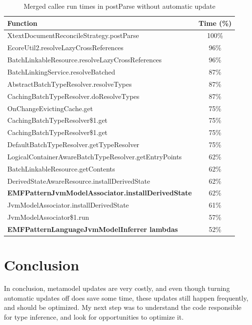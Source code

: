 \documentclass[11pt,a4paper,oneside]{report}
\begin{document}
\begin{table}[ht]
    \footnotesize
    \centering
    \begin{tabular}{ l c }
        \toprule
        Function & Time (\%) \\
        \midrule
        XtextDocumentReconcileStrategy.postParse & 100\% \\
        EcoreUtil2.resolveLazyCrossReferences & 96\% \\
        BatchLinkableResource.resolveLazyCrossReferences & 96\% \\
        BatchLinkingService.resolveBatched & 87\% \\
        AbstractBatchTypeResolver.resolveTypes & 87\% \\
        CachingBatchTypeResolver.doResolveTypes & 87\% \\
        OnChangeEvictingCache.get & 75\% \\
        CachingBatchTypeResolver\$1.get & 75\% \\
        CachingBatchTypeResolver\$1.get & 75\% \\
        DefaultBatchTypeResolver.getTypeResolver & 75\% \\
        LogicalContainerAwareBatchTypeResolver.getEntryPoints & 62\% \\
        BatchLinkableResource.getContents & 62\% \\
        DerivedStateAwareResource.installDerivedState & 62\% \\
        \textbf{EMFPatternJvmModelAssociator.installDerivedState} & 62\% \\
        JvmModelAssociator.installDerivedState & 61\% \\
        JvmModelAssociator\$1.run & 57\% \\
        \textbf{EMFPatternLanguageJvmModelInferrer lambdas} & 52\% \\
        \bottomrule
    \end{tabular}
    \caption{Merged callee run times in postParse without automatic update}
    \label{tab:postparse-no-auto-update}
\end{table}

\section{Conclusion}
In conclusion, metamodel updates are very costly, and even though turning
automatic updates off does save some time, these updates still happen
frequently, and should be optimized. My next step was to understand the code
responsible for type inference, and look for opportunities to optimize it.
\end{document}
